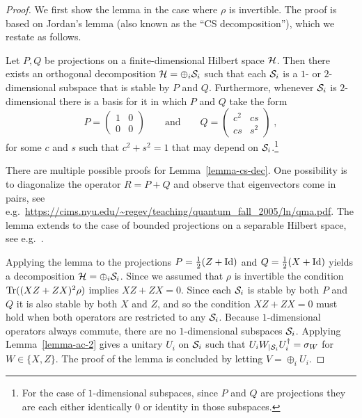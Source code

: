 \begin{proof}
We first show the lemma in the case where $\rho$ is invertible. The proof is based on Jordan's lemma (also known as the ``CS decomposition''), which we restate as follows. 


\begin{lemma}\label{lemma-cs-dec}
Let $P,Q$ be projections on a finite-dimensional Hilbert space $\mathcal{H}$. Then there exists an orthogonal decomposition $\mathcal{H} = \oplus_i \mathcal{S}_i$ such that each $\mathcal{S}_i$ is a $1$- or $2$-dimensional subspace that is stable by $P$ and $Q$. Furthermore, whenever $\mathcal{S}_i$ is $2$-dimensional there is a basis for it in which $P$ and $Q$ take the form
\begin{equation}\label{equation-pq-form}
 P = \begin{pmatrix} 1 & 0 \\ 0 & 0 \end{pmatrix} \qquad \text{and} \qquad Q = \begin{pmatrix} c^2 & cs \\ cs & s^2 \end{pmatrix}\;,
\end{equation}
 for some $c$ and $s$ such that $c^2+s^2=1$ that may depend on $\mathcal{S}_i$.\footnote{For the case of $1$-dimensional subspaces, since $P$ and $Q$ are projections they are each either identically $0$ or identity in those subspaces.}
\end{lemma} 

There are multiple possible proofs for Lemma~\ref{lemma-cs-dec}. One possibility is to diagonalize the operator $R=P+Q$ and observe that eigenvectors come in pairs, see e.g.~\url{https://cims.nyu.edu/~regev/teaching/quantum_fall_2005/ln/qma.pdf}. The lemma extends to the case of bounded projections on a separable Hilbert space, see e.g.~\cite[Theorem 1.1]{bottcher2010gentle}.

Applying the lemma to the projections $P = \frac{1}{2}(Z+\mathop{\rm Id}\nolimits)$ and $Q = \frac{1}{2}(X+\mathop{\rm Id}\nolimits)$ yields a decomposition $\mathcal{H} = \oplus_i \mathcal{S}_i$. Since we assumed that $\rho$ is invertible the condition $\mathrm{Tr}((XZ+ZX)^2\rho)$ implies $XZ+ZX=0$. Since each $\mathcal{S}_i$ is stable by both $P$ and $Q$ it is also stable by both $X$ and $Z$, and so the condition $XZ+ZX=0$ must hold when both operators are restricted to any $\mathcal{S}_i$. Because $1$-dimensional operators always commute, there are no $1$-dimensional subspaces $\mathcal{S}_i$. Applying Lemma~\ref{lemma-ac-2} gives a unitary $U_i$ on $\mathcal{S}_i$ such that $U_i W_{|\mathcal{S}_i} U_i^\dagger = \sigma_W$ for $W\in \{X,Z\}$. The proof of the lemma is concluded by letting $V = \oplus_i U_i$. 


\end{proof}

